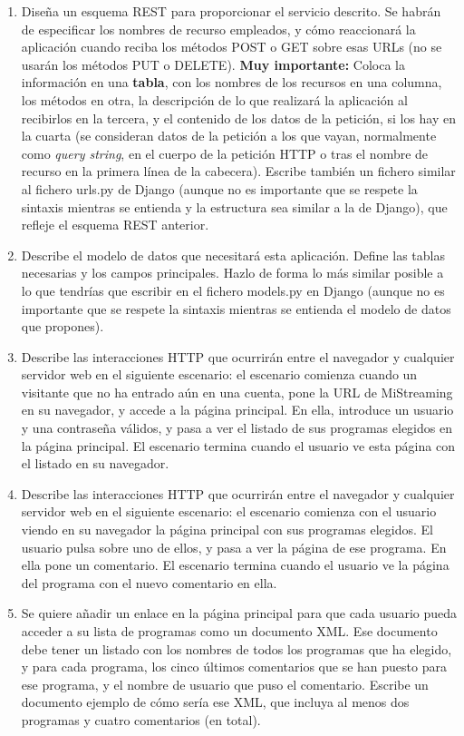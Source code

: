 \begin{enumerate}
\item Diseña un esquema REST para proporcionar el servicio descrito. Se habrán de especificar los nombres de recurso empleados, y cómo reaccionará la aplicación cuando reciba los métodos POST o GET sobre esas URLs (no se usarán los métodos PUT o DELETE). \textbf{Muy importante:} Coloca la información en una \textbf{tabla}, con los nombres de los recursos en una columna, los métodos en otra, la descripción de lo que realizará la aplicación al recibirlos en la tercera, y el contenido de los datos de la petición, si los hay en la cuarta (se consideran datos de la petición a los que vayan, normalmente como \emph{query string}, en el cuerpo de la petición HTTP o tras el nombre de recurso en la primera línea de la cabecera). Escribe también un fichero similar al fichero urls.py de Django (aunque no es importante que se respete la sintaxis mientras se entienda y la estructura sea similar a la de Django), que refleje el esquema REST anterior. 
\item Describe el modelo de datos que necesitará esta aplicación. Define las tablas necesarias y los campos principales. Hazlo de forma lo más similar posible a lo que tendrías que escribir en el fichero models.py en Django (aunque no es importante que se respete la sintaxis mientras se entienda el modelo de datos que propones).
\item Describe las interacciones HTTP que ocurrirán entre el navegador y cualquier servidor web en el siguiente escenario: el escenario comienza cuando un visitante que no ha entrado aún en una cuenta, pone la URL de MiStreaming en su navegador, y accede a la página principal. En ella, introduce un usuario y una contraseña válidos, y pasa a ver el listado de sus programas elegidos en la página principal. El escenario termina cuando el usuario ve esta página con el listado en su navegador.
\item Describe las interacciones HTTP que ocurrirán entre el navegador y cualquier servidor web en el siguiente escenario: el escenario comienza con el usuario viendo en su navegador la página principal con sus programas elegidos. El usuario pulsa sobre uno de ellos, y pasa a ver la página de ese programa. En ella pone un comentario. El escenario termina cuando el usuario ve la página del programa con el nuevo comentario en ella.
\item Se quiere añadir un enlace en la página principal para que cada usuario pueda acceder a su lista de programas como un documento XML. Ese documento debe tener un listado con los nombres de todos los programas que ha elegido, y para cada programa, los cinco últimos comentarios que se han puesto para ese programa, y el nombre de usuario que puso el comentario. Escribe un documento ejemplo de cómo sería ese XML, que incluya al menos dos programas y cuatro comentarios (en total).

\end{enumerate}

